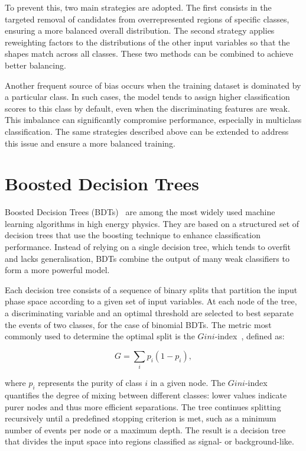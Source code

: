To prevent this, two main strategies are adopted. The first consists in the targeted removal of candidates from overrepresented regions of specific classes, ensuring a more balanced overall distribution. The second strategy applies reweighting factors to the distributions of the other input variables so that the shapes match across all classes. These two methods can be combined to achieve better balancing.

Another frequent source of bias occurs when the training dataset is dominated by a particular class. In such cases, the model tends to assign higher classification scores to this class by default, even when the discriminating features are weak. This imbalance can significantly compromise performance, especially in multiclass classification. The same strategies described above can be extended to address this issue and ensure a more balanced training.



\section{Boosted Decision Trees}
\label{sec:bdt_general}

Boosted Decision Trees (BDTs)~\cite{bdts} are among the most widely used machine learning algorithms in high energy physics. They are based on a structured set of decision trees that use the boosting technique to enhance classification performance. Instead of relying on a single decision tree, which tends to overfit and lacks generalisation, BDTs combine the output of many weak classifiers to form a more powerful model.

Each decision tree consists of a sequence of binary splits that partition the input phase space according to a given set of input variables. At each node of the tree, a discriminating variable and an optimal threshold are selected to best separate the events of two classes, for the case of binomial BDTs. The metric most commonly used to determine the optimal split is the $Gini$-index~\cite{gini}, defined as:

\begin{equation}
G = \sum_{i} p_i (1 - p_i),
\end{equation}

where $p_i$ represents the purity of class $i$ in a given node. The $Gini$-index quantifies the degree of mixing between different classes: lower values indicate purer nodes and thus more efficient separations. The tree continues splitting recursively until a predefined stopping criterion is met, such as a minimum number of events per node or a maximum depth. The result is a decision tree that divides the input space into regions classified as signal- or background-like.

